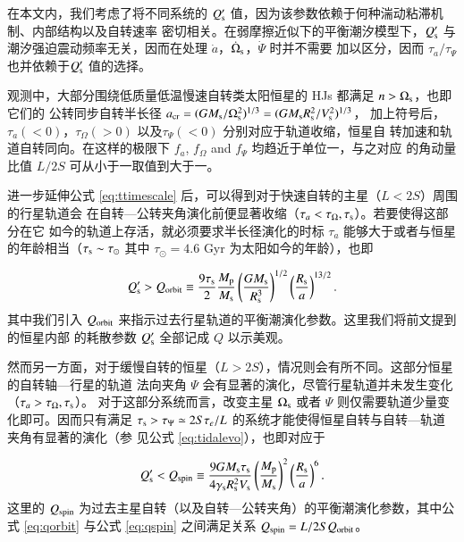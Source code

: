 在本文内，我们考虑了将不同系统的 $Q_\mathrm{s}^\prime$ 值，因为该参数依赖于何种湍动粘滞机制\cite{
Zahn1977,Goldreich1989,Penev2007}、内部结构\cite{Terquem1998,Goodman2009}以及自转速率
\cite{Ogilvie2007,Barker2009}密切相关。在弱摩擦近似下的平衡潮汐模型下，$Q_\mathrm{s}^\prime$ 与
潮汐强迫震动频率无关，因而在处理 $\dot{a}$，$\dot{\Omega}_\mathrm{s}$，$\dot{\varPsi}$ 时并不需要
加以区分，因而 $\tau_a / \tau_\Psi$ 也并依赖于$Q_\mathrm{s}^\prime$ 值的选择。

观测中，大部分围绕低质量低温慢速自转类太阳恒星的 HJs 都满足 $n>\Omega_\mathrm{s}$，也即它们的
公转同步自转半长径 $a_\mathrm{cr} = (GM_\mathrm{s}/\Omega_\mathrm{s}^2)^{1/3} = (GM_\mathrm{s}R_\mathrm{s}^2/V_\mathrm{s}^2)^{1/3}$，
加上符号后，$\tau_a (<0)$，$\tau_\Omega (>0)$ 以及$\tau_\Psi (<0)$ 分别对应于轨道收缩，恒星自
转加速和轨道自转同向。在这样的极限下 $f_a$, $f_\Omega$ and $f_\Psi$ 均趋近于单位一，与之对应
的角动量比值 $L/2S$ 可从小于一取值到大于一。

进一步延伸公式 \ref{eq:ttimescale} 后，可以得到对于快速自转的主星（$L<2S$）周围的行星轨道会
在自转---公转夹角演化前便显著收缩（$\tau_a < \tau_{\Omega},\tau_\mathrm{s}$）。若要使得这部分在它
如今的轨道上存活，就必须要求半长径演化的时标 $\tau_a$ 能够大于或者与恒星的年龄相当（$\tau_
\mathrm{s}\sim \tau_\odot$ 其中 $\tau_\odot =4.6$ Gyr 为太阳如今的年龄），也即

\begin{equation} \label{eq:qorbit} 
Q_\mathrm{s}^\prime > Q_{\rm orbit} \equiv {9 \tau_\mathrm{s} \over 2} 
{M_\mathrm{p} \over M_\mathrm{s}}  \left( {G M_\mathrm{s} \over R_\mathrm{s}^3} \right)^{1/2}
\left({R_\mathrm{s} \over a} \right)^{13/2}.
\end{equation}  %
其中我们引入 $Q_{\rm orbit}$ 来指示过去行星轨道的平衡潮演化参数。这里我们将前文提到的恒星内部
的耗散参数 $Q_\mathrm{s}^\prime $ 全部记成 $Q$ 以示美观。

然而另一方面，对于缓慢自转的恒星（$L>2S$），情况则会有所不同。这部分恒星的自转轴---行星的轨道
法向夹角 $\Psi$ 会有显著的演化，尽管行星轨道并未发生变化（$\tau_a >\tau_{\Omega},\tau_{\mathrm{s}}$）。
对于这部分系统而言，改变主星 $\Omega_\mathrm{s}$ 或者 $\Psi$ 则仅需要轨道少量变化即可。因而只有满足
$\tau_\mathrm{s}>\tau_\Psi \simeq 2S \tau_e/L$ 的系统才能使得恒星自转与自转---轨道夹角有显著的演化（参
见公式 \ref{eq:tidalevo}），也即对应于

\begin{equation}  \label{eq:qspin}
Q_\mathrm{s}^\prime < Q_{\rm spin} \equiv {9 G M_\mathrm{s} \tau_\mathrm{s} 
\over 4 \gamma_\mathrm{s} R_\mathrm{s}^2 V_\mathrm{s}} 
\left( {M_\mathrm{p} \over M_\mathrm{s}} \right)^2 
\left({R_\mathrm{s} \over a} \right)^{6}.
\end{equation} %
这里的 $Q_{\rm spin} $ 为过去主星自转（以及自转---公转夹角）的平衡潮演化参数，其中公式 \ref{eq:qorbit} 
与公式 \ref{eq:qspin} 之间满足关系 $Q_{\rm spin} = L/2S Q_{\rm orbit}$。

